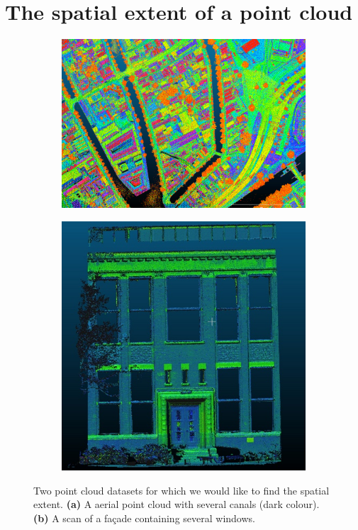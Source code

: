
\graphicspath{{spatialextent/}}

\chapter{The spatial extent of a point cloud}
\label{chap:spatialextent}

\begin{figure}[h]
  \centering
  \begin{subfigure}[b]{0.57\linewidth}
    \centering
    \includegraphics[width=\textwidth]{figs/ahn3-water.png}
    \caption{}
  \end{subfigure}%
  \qquad
  \begin{subfigure}[b]{0.37\linewidth}
    \centering
    \includegraphics[page=2,width=\textwidth]{figs/facade.jpg}
    \caption{}
  \end{subfigure}
\caption{Two point cloud datasets for which we would like to find the spatial extent. \textbf{(a)} A aerial point cloud with several canals (dark colour). \textbf{(b)} A scan of a façade containing several windows.}
\label{fig:examples}  
\end{figure}


